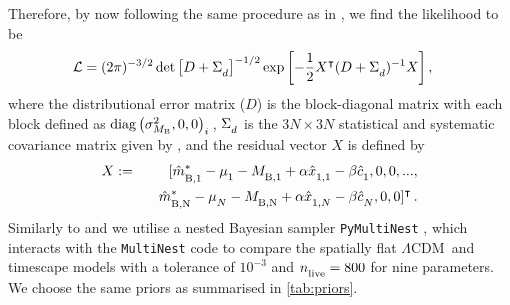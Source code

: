 \documentclass[fleqn,usenatbib,onecolumn,referee]{mnras}
\newcommand{\LA}{\Lambda}
\newcommand{\lcdm}{spatially flat $\LA$CDM}
\newcommand{\Z}[1]{_{\lower2pt\hbox{$\scriptstyle#1$}}}
\newcommand{\Ns}[1]{_{\lower2pt\hbox{$\scriptstyle\rm#1$}}}
\newcommand{\hblank}[1]{\hbox to#1 mm{\hfil}}
\begin{document}
Therefore, by now following the same procedure as in \citet{Lane_2023}, we find the likelihood to be
\begin{align}
    \mathcal{L} &= (2 \pi)^{-3/2} \det\left[ D + \Sigma \Z d \right]^{-1/2} \exp\left[-\frac{1}{2}X^\intercal( D + \Sigma \Z {d})^{-1} X\right]\label{eq:likelihoodFull},
\end{align}
where the distributional error matrix ($D$) is the block-diagonal matrix with each block defined as ${\rm diag}\left( \sigma^2_{M_{\rm B}}, 0, 0\right)_i\,$, $\Sigma \Z d$ is the $3N \times 3N$ statistical and systematic covariance matrix given by \citet[Sec.~2]{Lane_2023}, and the residual vector $X$ is defined by 
\begin{eqnarray*}
X &:=& [\hat{m}_{\lower2pt\hbox{$\scriptstyle \rm B,1$}}^{*}-\mu _{\lower2pt\hbox{$\scriptstyle 1$}}-M_{\lower2pt\hbox{$\scriptstyle \rm B,1$}} + \alpha \hat{x}_{\lower2pt\hbox{$\scriptstyle 1,1$}}-\beta \hat{c}_{\lower2pt\hbox{$\scriptstyle 1$}}, 0, 0, ..., \nonumber \\
&&\hbox to3mm{\hfil } \hat{m}_{\lower2pt\hbox{$\scriptstyle \rm B, N$}}^{*}-\mu _{\lower2pt\hbox{$\scriptstyle N$}}-M_{\lower2pt\hbox{$\scriptstyle \rm B, N$}} + \alpha \hat{x}_{\lower2pt\hbox{$\scriptstyle 1, N$}}-\beta \hat{c}_{\lower2pt\hbox{$\scriptstyle N$}}, 0, 0]^\intercal \, . 
\end{eqnarray*}
Similarly to \citet{Dam_2017} and \citet{Lane_2023} we utilise a nested Bayesian sampler \texttt{PyMultiNest} \citep{Buchner_2014}, which interacts with the \texttt{MultiNest} \citep{Feroz_2008, Feroz_2009, Feroz_2019} code to compare the \lcdm\ and timescape models with a tolerance of $10^{-3}$ and $n\Ns{live} = 800$ for nine parameters. We choose the same priors as \citet[Table~B2 \& Sec.~3]{Lane_2023} summarised in \cref{tab:priors}. 
\end{document}
